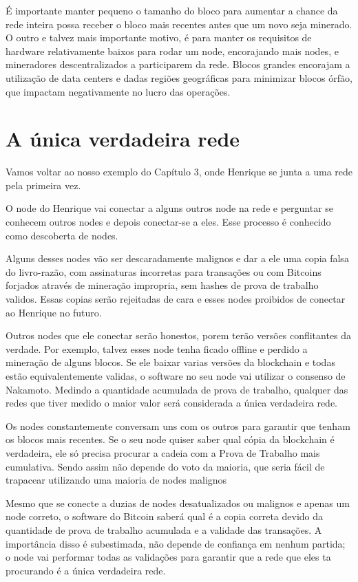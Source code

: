 É importante manter pequeno o tamanho do bloco para aumentar a chance da rede inteira possa receber o bloco mais recentes antes que um novo seja minerado.
O outro e talvez mais importante motivo, é para manter os requisitos de hardware relativamente baixos para rodar um node, encorajando mais nodes, e mineradores descentralizados a participarem da rede.
Blocos grandes encorajam a utilização de data centers e dadas regiões geográficas para minimizar blocos órfão, que impactam negativamente no lucro das operações.

\section*{A única verdadeira rede} %


Vamos voltar ao nosso exemplo do Capítulo 3, onde Henrique se junta a uma rede pela primeira vez.

O node do Henrique vai conectar a alguns outros node na rede e perguntar se conhecem outros nodes e depois conectar-se a eles. Esse processo é conhecido como descoberta de nodes.

Alguns desses nodes vão ser descaradamente malignos e dar a ele uma copia falsa do livro-razão, com assinaturas incorretas para transações ou com Bitcoins forjados através de mineração impropria, sem hashes de prova de trabalho validos. Essas copias serão rejeitadas de cara e esses nodes proibidos de conectar ao Henrique no futuro.

Outros nodes que ele conectar serão honestos, porem terão versões conflitantes da verdade. Por exemplo, talvez esses node tenha ficado offline e perdido a mineração de alguns blocos. Se ele baixar varias versões da blockchain e todas estão equivalentemente validas, o software no seu node vai utilizar o consenso de Nakamoto. Medindo a quantidade acumulada de prova de trabalho, qualquer das redes que tiver medido o maior valor  será  considerada a única verdadeira rede.

Os nodes constantemente conversam uns com os outros para garantir que tenham os blocos mais recentes.
Se o seu node quiser saber qual cópia da blockchain é verdadeira, ele só precisa procurar a cadeia com a Prova de Trabalho mais cumulativa.
Sendo assim \TraducaoNomeH{} não depende do voto da maioria, que seria fácil de trapacear utilizando uma maioria de nodes malignos

Mesmo que \TraducaoNomeH{} se conecte a duzias de nodes desatualizados ou malignos e apenas um node correto, o software do Bitcoin saberá qual é a copia correta devido  da quantidade de prova de trabalho acumulada e a validade das transações. A importância disso é subestimada, \TraducaoNomeH{} não depende de confiança em nenhum partida; o node vai performar todas as validações para garantir que a rede que eles ta procurando é a única verdadeira rede.


